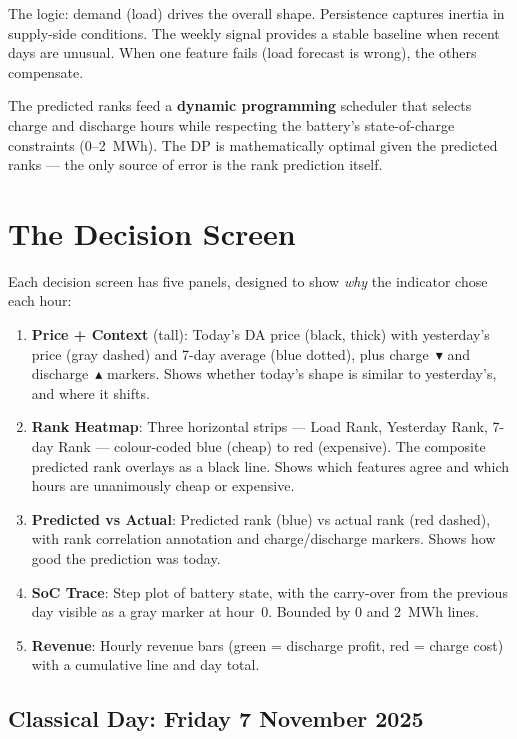 \documentclass[11pt,a4paper]{article}
\begin{document}
The logic: demand (load) drives the overall shape. Persistence captures inertia in supply-side conditions. The weekly signal provides a stable baseline when recent days are unusual. When one feature fails (load forecast is wrong), the others compensate.

The predicted ranks feed a \textbf{dynamic programming} scheduler that selects charge and discharge hours while respecting the battery's state-of-charge constraints (0--2~MWh). The DP is mathematically optimal given the predicted ranks --- the only source of error is the rank prediction itself.

\section{The Decision Screen}

Each decision screen has five panels, designed to show \emph{why} the indicator chose each hour:

\begin{enumerate}
\item \textbf{Price + Context} (tall): Today's DA price (black, thick) with yesterday's price (gray dashed) and 7-day average (blue dotted), plus charge~$\blacktriangledown$ and discharge~$\blacktriangle$ markers. Shows whether today's shape is similar to yesterday's, and where it shifts.
\item \textbf{Rank Heatmap}: Three horizontal strips --- Load Rank, Yesterday Rank, 7-day Rank --- colour-coded blue (cheap) to red (expensive). The composite predicted rank overlays as a black line. Shows which features agree and which hours are unanimously cheap or expensive.
\item \textbf{Predicted vs Actual}: Predicted rank (blue) vs actual rank (red dashed), with rank correlation annotation and charge/discharge markers. Shows how good the prediction was today.
\item \textbf{SoC Trace}: Step plot of battery state, with the carry-over from the previous day visible as a gray marker at hour~0. Bounded by 0 and 2~MWh lines.
\item \textbf{Revenue}: Hourly revenue bars (green = discharge profit, red = charge cost) with a cumulative line and day total.
\end{enumerate}

\subsection{Classical Day: Friday 7 November 2025}
\end{document}
